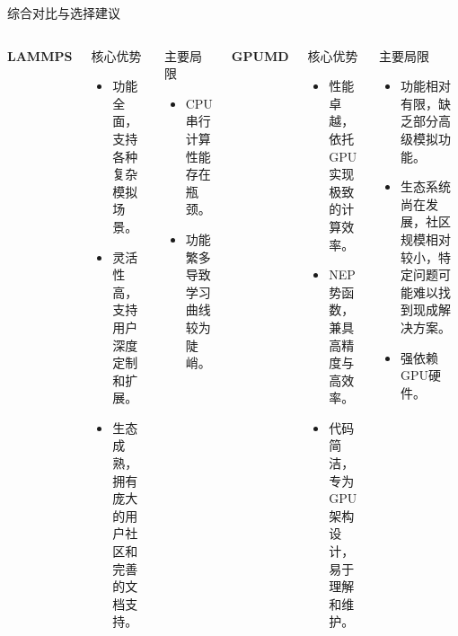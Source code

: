\documentclass{beamer}
\begin{document}
\begin{frame}{综合对比与选择建议}
    \begin{columns}
        \textbf{LAMMPS}
        \begin{block}{核心优势}
            \begin{itemize}
                \item 功能全面，支持各种复杂模拟场景。
                \item 灵活性高，支持用户深度定制和扩展。
                \item 生态成熟，拥有庞大的用户社区和完善的文档支持。
            \end{itemize}
        \end{block}
        \begin{block}{主要局限}
            \begin{itemize}
                \item CPU串行计算性能存在瓶颈。
                \item 功能繁多导致学习曲线较为陡峭。
            \end{itemize}
        \end{block}
        \textbf{GPUMD}
        \begin{block}{核心优势}
            \begin{itemize}
                \item 性能卓越，依托GPU实现极致的计算效率。
                \item NEP势函数，兼具高精度与高效率。
                \item 代码简洁，专为GPU架构设计，易于理解和维护。
            \end{itemize}
        \end{block}
        \begin{block}{主要局限}
            \begin{itemize}
                \item 功能相对有限，缺乏部分高级模拟功能。
                \item 生态系统尚在发展，社区规模相对较小，特定问题可能难以找到现成解决方案。
                \item 强依赖GPU硬件。
            \end{itemize}
        \end{block}
    \end{columns}
\end{frame}
\end{document}
